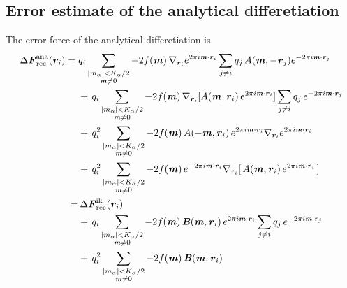 \documentclass[aps,pre,preprint]{revtex4}
\renewcommand{\v}[1]{\textbf{\textit{#1}}}
\begin{document}
\subsection{Error estimate of the analytical differetiation}

The error force of the analytical differetiation is 
\begin{align}\nonumber
  \Delta\v F_{\textrm{rec}}^{\textrm{ana}}(\v r_i)
  =\;&
  q_i
  \sum_{
    \begin{subarray}{c}
      \vert m_{\alpha}\vert < K_\alpha/2\\
      \v m\neq 0
    \end{subarray}}
  -2f(\v m)\,
  \nabla_{\v r_i}
  e^{2\pi i\v m\cdot \v r_i}
  \sum_{j\neq i}q_j\,
  A(\v m, -\v r_j)
  e^{-2\pi i\v m\cdot\v r_j} \\\nonumber
  & +\,
  q_i
  \sum_{
    \begin{subarray}{c}
      \vert m_{\alpha}\vert < K_\alpha/2\\
      \v m\neq 0
    \end{subarray}}
  -2f(\v m)\,
  \nabla_{\v r_i}
  [A(\v m, \v r_i)\,
  e^{2\pi i\v m\cdot \v r_i} ]
  \sum_{j\neq i}q_j\,
  e^{-2\pi i\v m\cdot\v r_j} \\\nonumber
  & +\,
  q^2_i
  \sum_{
    \begin{subarray}{c}
      \vert m_{\alpha}\vert < K_\alpha/2\\\nonumber
      \v m\neq 0
    \end{subarray}}
  -2f(\v m)\,
  A(-\v m, \v r_i)\,e^{2\pi i\v m\cdot \v r_i} \nabla_{\v r_i}e^{2\pi i\v m\cdot\v r_i} \\\nonumber
  & +\,
  q^2_i
  \sum_{
    \begin{subarray}{c}
      \vert m_{\alpha}\vert < K_\alpha/2\\
      \v m\neq 0
    \end{subarray}}
  -2f(\v m)\,
  e^{-2\pi i\v m\cdot \v r_i}
  \nabla_{\v r_i} [\,A(\v m, \v r_i) \,e^{2\pi i\v m\cdot\v r_i}\,]  \\\nonumber
  =&\,
  \Delta\v F_{\textrm{rec}}^{\textrm{ik}}(\v r_i)\\\nonumber
  & +\,
  q_i
  \sum_{
    \begin{subarray}{c}
      \vert m_{\alpha}\vert < K_\alpha/2\\
      \v m\neq 0
    \end{subarray}}
  -2f(\v m)\,
  \v B(\v m, \v r_i)\,e^{2\pi i\v m\cdot \v r_i}
  \sum_{j\neq i}q_j\,
  e^{-2\pi i\v m\cdot\v r_j} \\\label{eqn:ana.error.force}
  & +\,
  q^2_i
  \sum_{
    \begin{subarray}{c}
      \vert m_{\alpha}\vert < K_\alpha/2\\
      \v m\neq 0
    \end{subarray}}
  -2f(\v m)\,\v B(\v m, \v r_i) 
\end{align}
\end{document}
